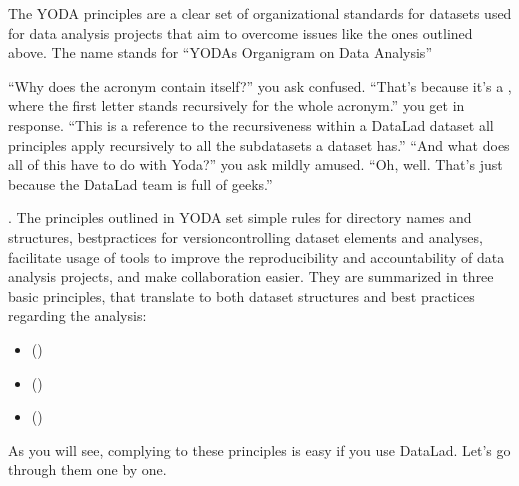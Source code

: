 \sphinxAtStartPar
The YODA principles are a clear set of organizational standards for
datasets used for data analysis projects that aim to overcome issues like the
ones outlined above. The name stands for
“YODAs Organigram on Data Analysis”%
\begin{footnote}\sphinxAtStartFootnote
“Why does the acronym contain itself?” you ask confused.
“That’s because it’s a ,
where the first letter stands recursively for the whole acronym.” you get in response.
“This is a reference to the recursiveness within a DataLad dataset \textendash{} all principles
apply recursively to all the subdatasets a dataset has.”
“And what does all of this have to do with Yoda?” you ask mildly amused.
“Oh, well. That’s just because the DataLad team is full of geeks.”
%
\end{footnote}. The principles outlined
in YODA set simple rules for directory names and structures, best\sphinxhyphen{}practices for
version\sphinxhyphen{}controlling dataset elements and analyses, facilitate
usage of tools to improve the reproducibility and accountability
of data analysis projects, and make collaboration easier.
They are summarized in three basic principles, that translate to both
dataset structures and best practices regarding the analysis:
\begin{itemize}
\item {} 
\sphinxAtStartPar
{\hyperref[\detokenize{basics/101-127-yoda:p1}]{}} ()

\item {} 
\sphinxAtStartPar
{\hyperref[\detokenize{basics/101-127-yoda:p2}]{}} ()

\item {} 
\sphinxAtStartPar
{\hyperref[\detokenize{basics/101-127-yoda:p3}]{}} ()

\end{itemize}

\sphinxAtStartPar
As you will see, complying to these principles is easy if you
use DataLad. Let’s go through them one by one.



